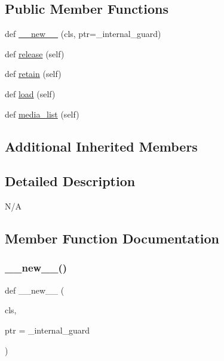 \subsection*{Public Member Functions}
\begin{DoxyCompactItemize}
\item 
def \hyperlink{classvlc_1_1_media_library_a2ed91930af7622fec54ade5b2d4b2315}{\+\_\+\+\_\+new\+\_\+\+\_\+} (cls, ptr=\+\_\+internal\+\_\+guard)
\item 
def \hyperlink{classvlc_1_1_media_library_a4cd51e19135e5ad4a19eae3ea9c60537}{release} (self)
\item 
def \hyperlink{classvlc_1_1_media_library_a6394d82a0b79f0f91bb059d20ab43490}{retain} (self)
\item 
def \hyperlink{classvlc_1_1_media_library_aea7c4ced230e9462362c980c5ea47b4d}{load} (self)
\item 
def \hyperlink{classvlc_1_1_media_library_a34194a0d394238d8794d182b65953952}{media\+\_\+list} (self)
\end{DoxyCompactItemize}
\subsection*{Additional Inherited Members}


\subsection{Detailed Description}
\begin{DoxyVerb}N/A
\end{DoxyVerb}
 

\subsection{Member Function Documentation}
\mbox{\label{classvlc_1_1_media_library_a2ed91930af7622fec54ade5b2d4b2315}} 
\subsubsection{\texorpdfstring{\+\_\+\+\_\+new\+\_\+\+\_\+()}{\_\_new\_\_()}}
{\footnotesize\ttfamily def \+\_\+\+\_\+new\+\_\+\+\_\+ (\begin{DoxyParamCaption}\item[{}]{cls,  }\item[{}]{ptr = {\ttfamily \+\_\+internal\+\_\+guard} }\end{DoxyParamCaption})}

